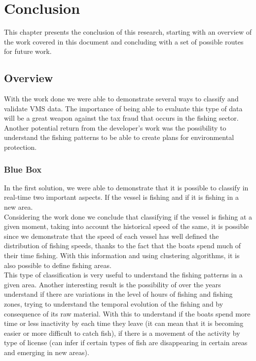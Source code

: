 % 
%  
%
\chapter{Conclusion}
\label{cha:conclusion}

This chapter presents the conclusion of this research, starting with an overview of the work covered in this document and concluding with a set of possible routes for future work.

\section{Overview} %
\label{sec:overview}
With the work done we were able to demonstrate several ways to classify and validate VMS data. The importance of being able to evaluate this type of data will be a great weapon against the tax fraud that occurs in the fishing sector. Another potential return from the developer's work was the possibility to understand the fishing patterns to be able to create plans for environmental protection.

\subsection{Blue Box} %
\label{sec:blue_box}

In the first solution, we were able to demonstrate that it is possible to classify in real-time two important aspects. If the vessel is fishing and if it is fishing in a new area.\\
Considering the work done we conclude that classifying if the vessel is fishing at a given moment, taking into account the historical speed of the same, it is possible since we demonstrate that the speed of each vessel has well defined the distribution of fishing speeds, thanks to the fact that the boats spend much of their time fishing.
With this information and using clustering algorithms, it is also possible to define fishing areas.\\

This type of classification is very useful to understand the fishing patterns in a given area. Another interesting result is the possibility of over the years understand if there are variations in the level of hours of fishing and fishing zones, trying to understand the temporal evolution of the fishing and by consequence of its raw material. With this to understand if the boats spend more time or less inactivity by each time they leave (it can mean that it is becoming easier or more difficult to catch fish), if there is a movement of the activity by type of license (can infer if certain types of fish are disappearing in certain areas and emerging in new areas).


